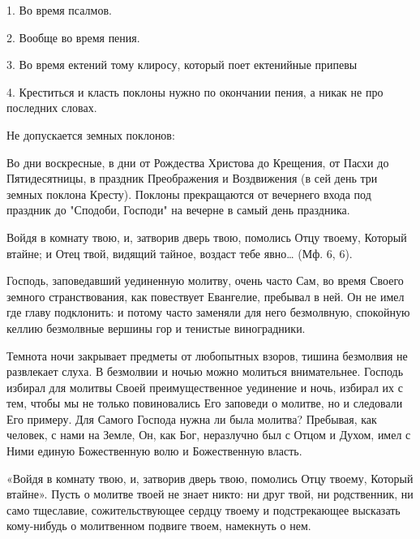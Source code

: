 \normalfont{}


1. Во время псалмов.

2. Вообще во время пения.

3. Во время ектений тому клиросу, который поет ектенийные припевы

4. Креститься и класть поклоны нужно по окончании пения, а никак не про последних словах.






\bfseries 


Не допускается земных поклонов:


\normalfont{}


Во дни воскресные, в дни от Рождества Христова до Крещения, от Пасхи до Пятидесятницы, в праздник Преображения и Воздвижения (в сей день три земных поклона Кресту). Поклоны прекращаются от вечернего входа под праздник до "Сподоби, Господи" на вечерне в самый день праздника.





\mychapterending

 


Войдя в комнату твою, и, затворив дверь твою, помолись Отцу твоему, Который втайне; и Отец твой, видящий тайное, воздаст тебе явно… (Мф. 6, 6).

Господь, заповедавший уединенную молитву, очень часто Сам, во время Своего земного странствования, как повествует Евангелие, пребывал в ней. Он не имел где главу подклонить: и потому часто заменяли для него безмолвную, спокойную келлию безмолвные вершины гор и тенистые виноградники.

Темнота ночи закрывает предметы от любопытных взоров, тишина безмолвия не развлекает слуха. В безмолвии и ночью можно молиться внимательнее. Господь избирал для молитвы Своей преимущественное уединение и ночь, избирал их с тем, чтобы мы не только повиновались Его заповеди о молитве, но и следовали Его примеру. Для Самого Господа нужна ли была молитва? Пребывая, как человек, с нами на Земле, Он, как Бог, неразлучно был с Отцом и Духом, имел с Ними единую Божественную волю и Божественную власть.

«Войдя в комнату твою, и, затворив дверь твою, помолись Отцу твоему, Который втайне». Пусть о молитве твоей не знает никто: ни друг твой, ни родственник, ни само тщеславие, сожительствующее сердцу твоему и подстрекающее высказать кому-нибудь о молитвенном подвиге твоем, намекнуть о нем.

